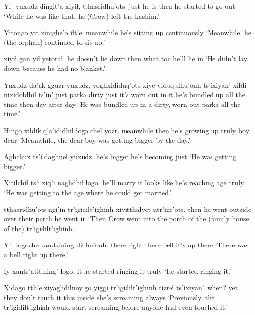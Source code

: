 \documentclass[12pt]{article}
\begin{document}
\gll Yi- yuxudz dingit'a xiyiɬ, tthasridhu'ots. 
{}  just   {he is}  then  {he started to go out}
\glt `While he was like that, he (Crow) left the kashim.'
\glend

\gll Yitongo   yit xinighe'o  iɬt'e.
meanwhile he's {sitting up} continuously
\glt `Meanwhile, he (the orphan) continued to sit up.'
\glend

           xiyiɬ gan  yiɬ yetotaɬ.
{he doesn't lie down} then  what too {he'll lie in}
\glt `He didn't lay down because he had no blanket.'
\glend

\gll Yuxudz da'ak gguzr yuxudz, yoghxididuq'ots xiye {viduq dhu'onh}   ts'ixiyan' xiɬdi {nixidoɬdhil ts'in' } 
just   parka dirty just    {it's worn out} {in it}  {he's bundled up} {all the time} then  {day after day} 
\glt `He was bundled up in a dirty, worn out parka all the time.'
\glend

\gll Hingo     xiɬdik q'a'ididhiɬ     ɬogo  chel yozr.
meanwhile then   {he's growing up} truly boy  dear
\glt `Meanwhile, the dear boy was getting bigger by the day.'
\glend

\gll Aghchux ts'i daghneɬ       yuxudz.
{he's bigger} {}      {he's becoming} just
\glt `He was getting bigger.'
\glend

\gll Xitiɬchiɬ   ts'i xiq'i         naghdhiɬ          ɬogo.
{he'll marry} {}  {it looks like} {he's reaching age} truly
\glt `He was getting to the age where he could get married.'
\glend

 tthasridhu'ots  ngi'in tr'igidiɬt'ighinh xivitthaɬyet ntr'ine'ots.
then             {he went outside} over   {}              {their porch} {he went in}
\glt `Then Crow went into the porch of the (family house of the) tr'igidiɬt'ighinh.
\glend

\gll Yit   ɬogoche     xandalning didhu'onh.
there {right there} bell       {it's up there}
\glt `There was a bell right up there.'
\glend

\gll Iy xantr'atitlning'      ɬogo.
it {he started ringing it} truly 
\glt `He started ringing it.'
\glend

\gll Xidago tth'e xiyaghdiɬnoy        go yiggi tr'igidiɬt'ighinh tizreɬ      ts'ixiyan'.
when? yet   {they don't touch it} this inside   {}      {she's screaming } always
\glt `Previously, the tr'igidiɬt'ighinh would start screaming before anyone had even touched it.'
\glend
\end{document}
